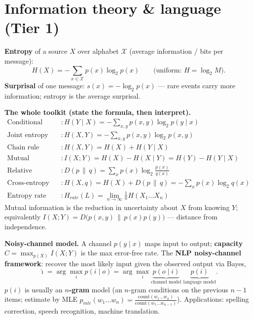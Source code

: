 \documentclass[11pt,a4paper]{article}
\begin{document}
\section{Information theory \& language (Tier 1)}

\begin{must}
\textbf{Entropy} of a source $X$ over alphabet $\mathcal X$ (average information / bits per message):
\[
  H(X)=-\!\!\sum_{x\in\mathcal X}p(x)\log_2 p(x)
  \qquad\bigl(\text{uniform: }H=\log_2 M\bigr).
\]
\textbf{Surprisal} of one message: $s(x)=-\log_2 p(x)$ --- rare events carry more information; entropy is the average surprisal.
\end{must}

\begin{useful}
\textbf{The whole toolkit (state the formula, then interpret).}
\begin{align*}
\text{Conditional entropy} &: H(Y\mid X)=-\!\!\sum_{x,y}p(x,y)\log_2 p(y\mid x)\\
\text{Joint entropy} &: H(X,Y)=-\!\!\sum_{x,y}p(x,y)\log_2 p(x,y)\\
\text{Chain rule} &: H(X,Y)=H(X)+H(Y\mid X)\\
\text{Mutual information} &: I(X;Y)=H(X)-H(X\mid Y)=H(Y)-H(Y\mid X)\\
\text{Relative entropy (KL)} &: D(p\,\|\,q)=\sum_x p(x)\log_2\tfrac{p(x)}{q(x)}\\
\text{Cross-entropy} &: H(X,q)=H(X)+D(p\,\|\,q)=-\!\sum_x p(x)\log_2 q(x)\\
\text{Entropy rate} &: H_{rate}(L)=\lim_{n\to\infty}\tfrac1n H(X_1\dots X_n)
\end{align*}
Mutual information is the reduction in uncertainty about $X$ from knowing $Y$; equivalently $I(X;Y)=D\big(p(x,y)\,\|\,p(x)p(y)\big)$ --- distance from independence.
\end{useful}

\begin{must}
\textbf{Noisy-channel model.} A channel $p(y\mid x)$ maps input to output; \textbf{capacity} $C=\max_{p(X)} I(X;Y)$ is the max error-free rate. The \textbf{NLP noisy-channel framework}: recover the most likely input given the observed output via Bayes,
\[
  \hat\imath=\arg\max_i p(i\mid o)=\arg\max_i \underbrace{p(o\mid i)}_{\text{channel model}}\;\underbrace{p(i)}_{\text{language model}} .
\]
$p(i)$ is usually an \textbf{$n$-gram} model (an $n$-gram conditions on the previous $n{-}1$ items; estimate by MLE $p_{mle}(w_1\dots w_n)=\frac{\mathrm{count}(w_1\dots w_n)}{\mathrm{count}(w_1\dots w_{n-1})}$). Applications: spelling correction, speech recognition, machine translation.
\end{must}
\end{document}

